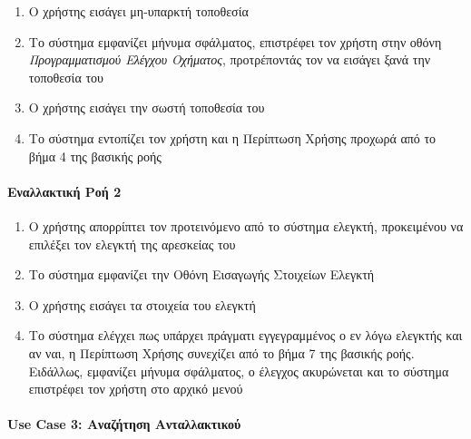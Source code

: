 \documentclass{../ol-softwaremanual}
\begin{document}
	\begin{enumerate}
		\item Ο χρήστης εισάγει μη-υπαρκτή τοποθεσία
		\item Το σύστημα εμφανίζει μήνυμα σφάλματος, επιστρέφει τον χρήστη στην οθόνη \textit{Προγραμματισμού Ελέγχου Οχήματος}, προτρέποντάς τον να εισάγει ξανά την τοποθεσία του
		\item Ο χρήστης εισάγει την σωστή τοποθεσία του
		\item Το σύστημα εντοπίζει τον χρήστη και η Περίπτωση Χρήσης προχωρά από το βήμα 4 της βασικής ροής
	\end{enumerate}
	
	\paragraph{Εναλλακτική Ροή 2}
	
	\begin{enumerate}
		\item Ο χρήστης απορρίπτει τον προτεινόμενο από το σύστημα ελεγκτή, προκειμένου να επιλέξει τον ελεγκτή της αρεσκείας του
		\item Το σύστημα εμφανίζει την Οθόνη Εισαγωγής Στοιχείων Ελεγκτή
		\item Ο χρήστης εισάγει τα στοιχεία του ελεγκτή
		\item Το σύστημα ελέγχει πως υπάρχει πράγματι εγγεγραμμένος ο εν λόγω ελεγκτής και αν ναι, η Περίπτωση Χρήσης συνεχίζει από το βήμα 7 της βασικής ροής. Ειδάλλως, εμφανίζει μήνυμα σφάλματος, ο έλεγχος ακυρώνεται και το σύστημα επιστρέφει τον χρήστη στο αρχικό μενού
	\end{enumerate}	
	
	
	
	
	\paragraph{\en Use Case 3: \gr Αναζήτηση Ανταλλακτικού}	
	
\end{document}
